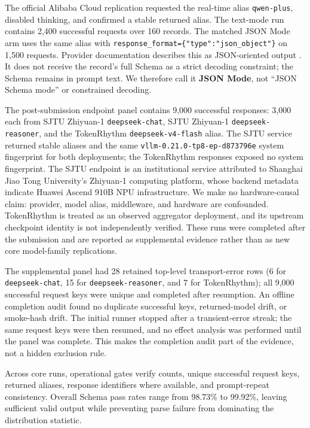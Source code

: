 \documentclass[11pt,a4paper]{article}
\begin{document}
The official Alibaba Cloud replication requested the real-time alias \texttt{qwen-plus}, disabled thinking, and confirmed a stable returned alias. The text-mode run contains 2,400 successful requests over 160 records. The matched JSON Mode arm uses the same alias with \texttt{response\allowbreak{}\_format=\allowbreak{}\{"type":\allowbreak{}"json\_ob\allowbreak{}ject"\}} on 1,500 requests. Provider documentation describes this as JSON-oriented output \citep{alibaba2026jsonmode}. It does not receive the record's full Schema as a strict decoding constraint; the Schema remains in prompt text. We therefore call it \textbf{JSON Mode}, not ``JSON Schema mode'' or constrained decoding.

The post-submission endpoint panel contains 9,000 successful responses: 3,000 each from SJTU Zhiyuan-1 \texttt{deepseek-chat}, SJTU Zhiyuan-1 \texttt{deepseek-reasoner}, and the TokenRhythm \texttt{deepseek-v4-flash} alias. The SJTU service returned stable aliases and the same \texttt{vllm-0.21.0-tp8-ep-d873796e} system fingerprint for both deployments; the TokenRhythm responses exposed no system fingerprint. The SJTU endpoint is an institutional service attributed to Shanghai Jiao Tong University's Zhiyuan-1 computing platform, whose backend metadata indicate Huawei Ascend 910B NPU infrastructure. We make no hardware-causal claim: provider, model alias, middleware, and hardware are confounded. TokenRhythm is treated as an observed aggregator deployment, and its upstream checkpoint identity is not independently verified. These runs were completed after the submission and are reported as supplemental evidence rather than as new core model-family replications.

The supplemental panel had 28 retained top-level transport-error rows (6 for \texttt{deepseek-chat}, 15 for \texttt{deepseek-reasoner}, and 7 for TokenRhythm); all 9,000 successful request keys were unique and completed after resumption. An offline completion audit found no duplicate successful keys, returned-model drift, or smoke-hash drift. The initial runner stopped after a transient-error streak; the same request keys were then resumed, and no effect analysis was performed until the panel was complete. This makes the completion audit part of the evidence, not a hidden exclusion rule.

Across core runs, operational gates verify counts, unique successful request keys, returned aliases, response identifiers where available, and prompt-repeat consistency. Overall Schema pass rates range from 98.73\% to 99.92\%, leaving sufficient valid output while preventing parse failure from dominating the distribution statistic.
\end{document}
